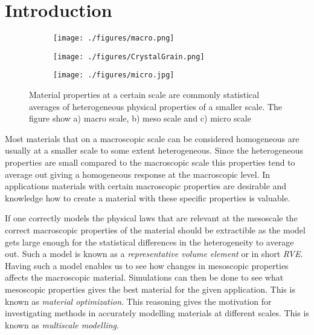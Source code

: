 \documentclass[introduction.tex]{subfiles}
\begin{document}
\chapter{Introduction}



 \begin{figure}
\centering

\begin{subfigure}{.1\textwidth}
  \centering
  \texttt{[image: ./figures/macro.png]}
  \caption{}
  \label{fig:macro}
\end{subfigure}
\scalebox{1.5}{$\boldsymbol{\longleftarrow}$}
\begin{subfigure}{.33\textwidth}
  \centering
  \texttt{[image: ./figures/CrystalGrain.png]}
  \caption{}
  \label{fig:meso}
\end{subfigure}%
\scalebox{1.5}{$\boldsymbol{\longleftarrow}$}
\begin{subfigure}{.33\textwidth}
  \centering
  \texttt{[image: ./figures/micro.jpg]}
  \caption{}
  \label{fig:micro}
\end{subfigure}
\caption{Material properties at a certain scale are commonly statistical averages of heterogeneous physical properties of a smaller scale. The figure show a) macro scale, b) meso scale\cite{wiki:grain} and c) micro scale\cite{Ozawa:ko5009}}
\label{micmacmes}
\end{figure}


Most materials that on a macroscopic scale can be considered homogeneous are usually at a smaller scale to some extent heterogeneous. Since the heterogeneous properties are small compared to the macroscopic scale this properties tend to average out giving a homogeneous response at the macroscopic level. In applications materials with certain macroscopic properties are desirable and knowledge how to create a material with these specific properties is valuable. 

If one correctly models the physical laws that are relevant at the mesoscale the correct macroscopic properties of the material should be extractible as the model gets large enough for the statistical differences in the heterogeneity to average out. Such a model is known as a \textit{representative volume element} or in short \textit{RVE}. Having such a model enables us to see how changes in mesoscopic properties affects the macroscopic material. Simulations can then be done to see what mesoscopic properties gives the best material for the given application. This is known as \textit{material optimization}. This reasoning gives the motivation for investigating methods in accurately modelling materials at different scales. This is known as \textit{multiscale modelling}.
\end{document}

